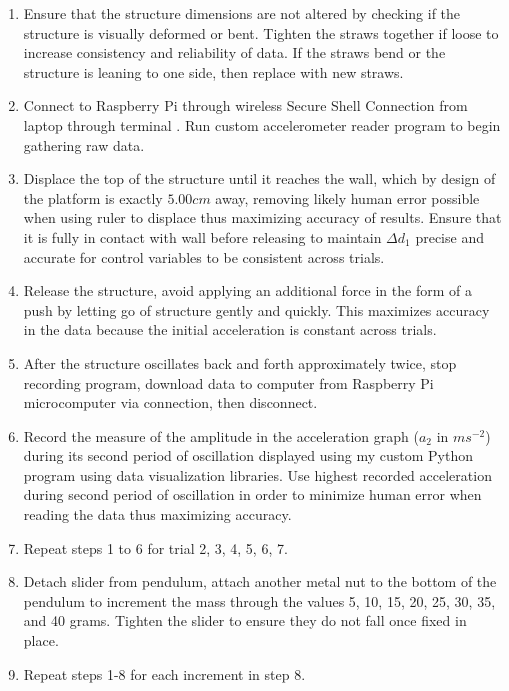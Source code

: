 \documentclass[11pt]{article}
\begin{document}
\begin{enumerate}

\item Ensure that the structure dimensions are not altered by checking if the structure is visually deformed or bent. Tighten the straws together if loose to increase consistency and reliability of data. If the straws bend or the structure is leaning to one side, then replace with new straws.
\item Connect to Raspberry Pi through wireless Secure Shell Connection from laptop through terminal \autocite{ssh}. Run custom accelerometer reader program to begin gathering raw data.
\item Displace the top of the structure until it reaches the wall, which by design of the platform is exactly $5.00cm$ away, removing likely human error possible when using ruler to displace thus maximizing accuracy of results. Ensure that it is fully in contact with wall before releasing to maintain $\Delta d_1$ precise and accurate for control variables to be consistent across trials.

\item Release the structure, avoid applying an additional force in the form of a push by letting go of structure gently and quickly. This maximizes accuracy in the data because the initial acceleration is constant across trials.
\item After the structure oscillates back and forth approximately twice, stop recording program, download data to computer from Raspberry Pi microcomputer via connection, then disconnect.
\item Record the measure of the amplitude in the acceleration graph ($a_2$ in $ms^{-2}$) during its second period of oscillation displayed using my custom Python program using data visualization libraries. Use highest recorded acceleration during second period of oscillation in order to minimize human error when reading the data thus maximizing accuracy.
\item Repeat steps 1 to 6 for trial 2, 3, 4, 5, 6, 7.
\item Detach slider from pendulum, attach another metal nut to the bottom of the pendulum to increment the mass through the values 5, 10, 15, 20, 25, 30, 35, and 40 grams. Tighten the slider to ensure they do not fall once fixed in place.
\item Repeat steps 1-8 for each increment in step 8.

\end{enumerate}
\end{document}
